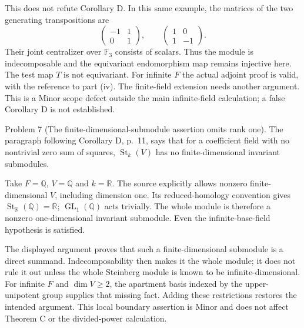 \documentclass[10pt]{article}
\begin{document}
This does not refute Corollary D. In this same example, the matrices of the two generating transpositions are \[\begin{pmatrix}-1&1\\0&1\end{pmatrix},\qquad
 \begin{pmatrix}1&0\\1&-1\end{pmatrix}.\] Their joint centralizer over \(\mathbb F_3\) consists of scalars. Thus the module is indecomposable and the equivariant endomorphism map remains injective here. The test map \(T\) is not equivariant. For infinite \(F\) the actual adjoint proof is valid, with the reference to part (iv). The finite-field extension needs another argument. This is a Minor scope defect outside the main infinite-field calculation; a false Corollary D is not established.\par
Problem 7 (The finite-dimensional-submodule assertion omits rank one).  The paragraph following Corollary D, p. 11, says that for a coefficient field with no nontrivial zero sum of squares, \(\operatorname{St}_k(V)\) has no finite-dimensional invariant submodules.\par
Take \(F=\mathbb Q\), \(V=\mathbb Q\) and \(k=\mathbb R\). The source explicitly allows nonzero finite-dimensional \(V\), including dimension one. Its reduced-homology convention gives \(\operatorname{St}_\mathbb R(\mathbb Q)=\mathbb R\); \(\operatorname{GL}_1(\mathbb Q)\) acts trivially. The whole module is therefore a nonzero one-dimensional invariant submodule. Even the infinite-base-field hypothesis is satisfied.\par
The displayed argument proves that such a finite-dimensional submodule is a direct summand. Indecomposability then makes it the whole module; it does not rule it out unless the whole Steinberg module is known to be infinite-dimensional. For infinite \(F\) and \(\dim V\geq2\), the apartment basis indexed by the upper-unipotent group supplies that missing fact. Adding these restrictions restores the intended argument. This local boundary assertion is Minor and does not affect Theorem C or the divided-power calculation.\par
\end{document}
